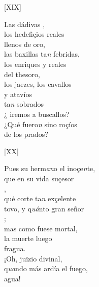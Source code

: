 \documentclass[11pt,a4paper,twoside]{article}
\begin{document}
{\begin{center}
	[XIX]
\end{center}
\pstart
Las dádivas ,\\
los hedefiçios reales\\
llenos de oro,\\
las baxillas ta\textit{n} febridas,\\
los enriques y reales\\
del thesoro,\\
los jaezes, los cavallos\\
 y atavíos\\
ta\textit{n} sobrados\\
¿ iremos a buscallos?\\
¿Qué fuero\textit{n} sino roçíos\\
de los prados?
\pend

\begin{center}
	[XX]
\end{center}
\pstart
Pues su herm\textit{an}o el inoçe\textit{n}te,\\
que en su vida suçesor\\
,\\
qué corte ta\textit{n} exçelente\\
tovo, y q\textit{uá}nto gran señor\\
 ;\\
mas como fuese mortal,\\
 la muerte luego\\
 fragua.\\
¡Oh, juïzio divinal,\\
q\textit{ua}ndo más ardía el fuego,\\
 agua!
\pend

}
\end{document}
